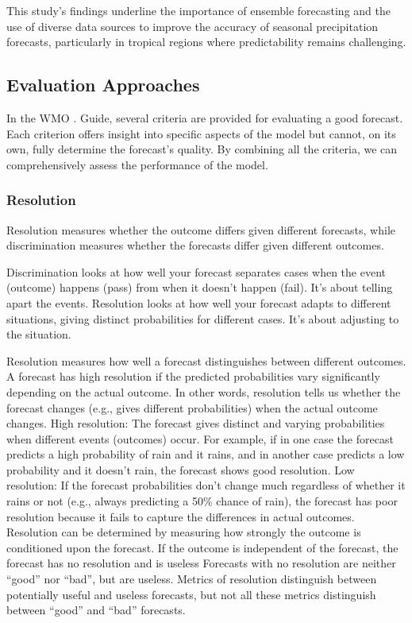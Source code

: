 This study's findings underline the importance of ensemble forecasting and the use of diverse data sources to improve the accuracy of seasonal precipitation forecasts, particularly in tropical regions where predictability remains challenging.


\subsection{Evaluation Approaches}


In the WMO\footnotemark{} . Guide, several criteria are provided for evaluating a good forecast. Each criterion offers insight into specific aspects of the model but cannot, on its own, fully determine the forecast's quality. By combining all the criteria, we can comprehensively assess the performance of the model.	 
		\subsubsection{Resolution}
	Resolution measures whether the outcome differs given different forecasts, while discrimination measures whether the forecasts differ given different outcomes.

Discrimination looks at how well your forecast separates cases when the event (outcome) happens (pass) from when it doesn’t happen (fail). It’s about telling apart the events.
Resolution looks at how well your forecast adapts to different situations, giving distinct probabilities for different cases. It’s about adjusting to the situation.

Resolution measures how well a forecast distinguishes between different outcomes. A forecast has high resolution if the predicted probabilities vary significantly depending on the actual outcome. In other words, resolution tells us whether the forecast changes (e.g., gives different probabilities) when the actual outcome changes.
High resolution: The forecast gives distinct and varying probabilities when different events (outcomes) occur. For example, if in one case the forecast predicts a high probability of rain and it rains, and in another case predicts a low probability and it doesn’t rain, the forecast shows good resolution.
Low resolution: If the forecast probabilities don’t change much regardless of whether it rains or not (e.g., always predicting a 50\% chance of rain), the forecast has poor resolution because it fails to capture the differences in actual outcomes.
Resolution can be determined by measuring how strongly the outcome is conditioned upon the forecast.
If the outcome is independent of the forecast, the forecast has no resolution and is useless
Forecasts with no resolution are neither “good” nor “bad”, but are useless. 
Metrics of resolution distinguish between potentially useful and useless forecasts, but not all these metrics distinguish between “good” and “bad” forecasts.

